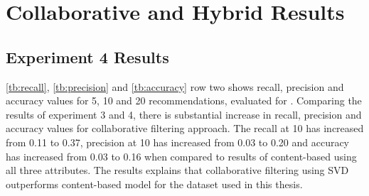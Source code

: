 \section{Collaborative and Hybrid Results}
\subsection{Experiment 4 Results}
\label{sec:res4}
\autoref{tb:recall}, \autoref{tb:precision} and \autoref{tb:accuracy} row two shows recall, precision and accuracy values for 5, 10 and 20 recommendations, evaluated for . Comparing the results of experiment 3 and 4, there is substantial increase in recall, precision and accuracy values for collaborative filtering approach. The recall at 10 has increased from 0.11 to 0.37, precision at 10 has increased from 0.03 to 0.20 and accuracy has increased from 0.03 to 0.16 when compared to results of content-based using all three attributes. The results explains that collaborative filtering using SVD outperforms content-based model for the dataset used in this thesis.

